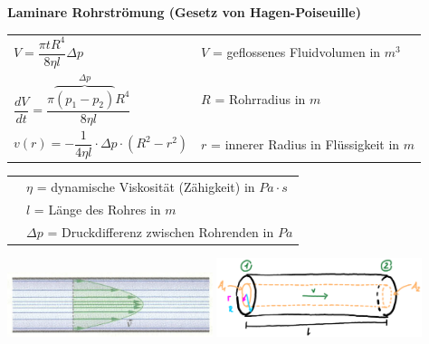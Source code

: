 				\begin{minipage}{12cm}
					\textbf{Laminare Rohrströmung (Gesetz von Hagen-Poiseuille)}
						\renewcommand{\arraystretch}{2.5}
						\begin{tabular}{ p{4cm} | p{7cm}}
							$V = \dfrac{\pi tR^4}{8 \eta l}\Delta p$	&	$V$ = geflossenes Fluidvolumen in $m^3$\\
							$\dfrac{dV}{dt} = \dfrac{\pi \overbrace{(p_1 - p_2)}^{\Delta p} R^4}{8 \eta l}$	& $R$ = Rohrradius in $m$\\
							$v(r) = -\dfrac{1}{4 \eta l} \cdot \Delta p \cdot (R^2-r^2)$ & $r$ = innerer Radius in Flüssigkeit in $m$\\
						\end{tabular}
						\renewcommand{\arraystretch}{1.5}
						\begin{tabular}{ p{4cm} | p{8cm} }
							& $\eta$ = dynamische Viskosität (Zähigkeit) in $Pa \cdot s$\\
							& $l$ = Länge des Rohres in $m$\\
							&	$\Delta p$ = Druckdifferenz zwischen Rohrenden in $Pa$\\
						\end{tabular} 
						\renewcommand{\arraystretch}{1}
				\end{minipage}
				\begin{minipage}{10cm}
					\vspace{-\ht\strutbox}\includegraphics[width=6cm]{./bilder/Rohrstroemung1.png}
					\vspace{-\ht\strutbox}\includegraphics[width=6cm]{./bilder/Rohrstroemung2.png}
				\end{minipage}
				\newline
			\newline
